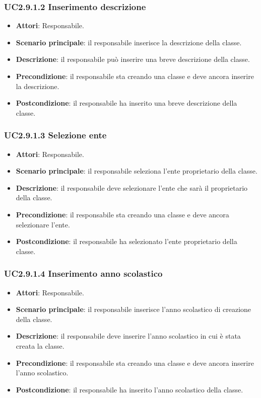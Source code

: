 \subsubsection{UC2.9.1.2 Inserimento descrizione}
\begin{itemize}
\item \textbf{Attori}: Responsabile.
\item \textbf{Scenario principale}: il responsabile inserisce la descrizione della classe.
\item \textbf{Descrizione}: il responsabile può inserire una breve descrizione della classe.
\item \textbf{Precondizione}: il responsabile sta creando una classe e deve ancora inserire la descrizione.
\item \textbf{Postcondizione}: il responsabile ha inserito una breve descrizione della classe.
\end{itemize}
\subsubsection{UC2.9.1.3 Selezione ente}
\begin{itemize}
\item \textbf{Attori}: Responsabile.
\item \textbf{Scenario principale}: il responsabile seleziona l'ente proprietario della classe.
\item \textbf{Descrizione}: il responsabile deve selezionare l'ente che sarà il proprietario della classe.
\item \textbf{Precondizione}: il responsabile sta creando una classe e deve ancora selezionare l'ente.
\item \textbf{Postcondizione}: il responsabile ha selezionato l'ente proprietario della classe.
\end{itemize}
\subsubsection{UC2.9.1.4 Inserimento anno scolastico}
\begin{itemize}
\item \textbf{Attori}: Responsabile.
\item \textbf{Scenario principale}: il responsabile inserisce l'anno scolastico di creazione della classe.
\item \textbf{Descrizione}: il responsabile deve inserire l'anno scolastico in cui è stata creata la classe.
\item \textbf{Precondizione}: il responsabile sta creando una classe e deve ancora inserire l'anno scolastico.
\item \textbf{Postcondizione}: il responsabile ha inserito l'anno scolastico della classe.
\end{itemize}
